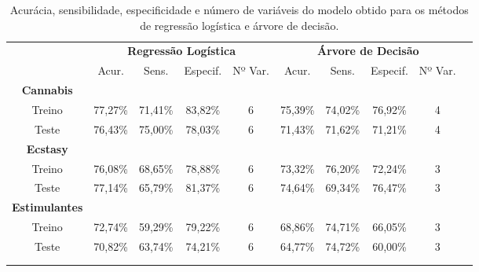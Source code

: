 \begin{table}[H]
\centering
\addtolength{\leftskip}{-0.8cm}
\begin{tabular}{cccccccccc}
\hline
 & \multicolumn{4}{c}{\textbf{Regressão Logística}} & \multicolumn{4}{c}{\textbf{Árvore de Decisão}} &  &  &  \\
 & Acur. & Sens. & Especif.& Nº Var. & Acur. & Sens. & Especif. & Nº Var. &  \\ \hline
\textbf{Cannabis} &  &  &  &  &  &  &  &  & \\
Treino & 77,27\% & 71,41\% & 83,82\% & 6& 75,39\% & 74,02\% & 76,92\% & 4&  \\
Teste &  76,43\% &  75,00\% &  78,03\% & 6&  71,43\% &  71,62\%&  71,21\%& 4 &  \\ \hline
\textbf{Ecstasy} &  &  &  &  &  &  &  &  &  \\
Treino & 76,08\% & 68,65\% & 78,88\% & 6& 73,32\% & 76,20\% & 72,24\%  & 3&  \\
Teste &  77,14\% & 65,79\% & 81,37\% & 6& 74,64\% & 69,34\% & 76,47\% & 3 &  \\ \hline
\textbf{Estimulantes} &  &  &  &  &  &  &  &  &  \\
Treino & 72,74\% & 59,29\% & 79,22\% & 6& 68,86\%& 74,71\% & 66,05\% & 3 &  \\
Teste & 70,82\% & 63,74\% & 74,21\% & 6& 64,77\% & 74,72\% & 60,00\% & 3 &  \\ \hline
 &  &  &  &  &  &  &  &  &  \\
 &  &  &  &  &  &  &  &  & 
\end{tabular}
\caption{Acurácia, sensibilidade, especificidade e número de variáveis do modelo obtido para os métodos de regressão logística e árvore de decisão.}
\label{tabela_resultados_com_var}
\end{table}